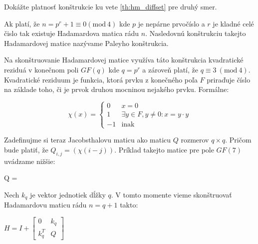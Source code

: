 \begin{exercise}
\label{ex:hm_diffset}
Dokážte platnosť konštrukcie ku vete \ref{th:hm_diffset} pre druhý smer. 
\end{exercise}

\begin{theorem}
\label{th:hm_paley}
Ak platí, že $n = p^r + 1 \equiv 0 (\textrm{mod}\ 4)$ kde $p$ je nepárne prvočíslo a $r$ je kladné celé čislo tak existuje Hadamardova matica rádu $n$.
Nasledovnú konštrukciu takejto Hadamardovej matice nazývame Paleyho konštrukcia.
\end{theorem}
\begin{construction}

Na skonštruovanie Hadamardovej matice využíva táto konštrukcia kvadratické reziduá v konečnom poli $GF(q)$ kde $q = p^r$ a zároveň platí, že
$q \equiv 3\ (\textrm{mod}\ 4)$. Kvadratické reziduum je funkcia, ktorá prvku z konečného poľa $F$ priraďuje číslo na základe toho, či je prvok
druhou mocninou nejakého prvku. Formálne:

\begin{center}
\begin{equation*}
    \chi(x) = \begin{cases}
               0               & x = 0\\
               1               & \exists y \in F, y \neq 0: x = y \cdot y\\
               -1              & \text{inak}
           \end{cases}
\end{equation*}
\end{center}

Zadefinujme si teraz Jacobsthalovu maticu ako maticu $Q$ rozmerov $q\times q$. Pričom bude platiť, že $Q_{i,j} = (\chi(i-j))$.
Príklad takejto matice pre pole $GF(7)$ uvádzame nižšie:

\begin{center}
Q = 
\end{center}

Nech $k_q$ je vektor jednotiek dĺžky $q$. V tomto momente vieme skonštruovať Hadamardovu maticu rádu $n = q+1$ takto:


\begin{center}
$H = I + \begin{bmatrix}
0 & k_q \\
k_q^T & Q
\end{bmatrix}$
\end{center}

\end{construction}


